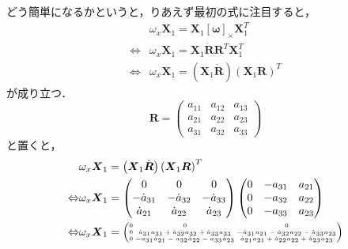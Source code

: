 どう簡単になるかというと，りあえず最初の式に注目すると，
\begin{align}
  & \omega_{x} \boldsymbol{X}_1 = \boldsymbol{X}_1 [\boldsymbol{\omega}]_{\times} \boldsymbol{X}_1^{T}\\
  \Leftrightarrow & \omega_{x} \boldsymbol{X}_1 = \boldsymbol{X}_1 \dot{\boldsymbol{R}} \boldsymbol{R}^{T} \boldsymbol{X}_1^{T}\\
  \Leftrightarrow & \omega_{x} \boldsymbol{X}_1 = \left(\boldsymbol{X}_1 \dot{\boldsymbol{R}}\right) \left(\boldsymbol{X}_1 \boldsymbol{R}\right)^{T}
\end{align}
が成り立つ．
\begin{equation}
  \boldsymbol{R} = \begin{pmatrix}
      a_{11} & a_{12} & a_{13}\\
      a_{21} & a_{22} & a_{23}\\
      a_{31} & a_{32} & a_{33}
  \end{pmatrix}
\end{equation}
と置くと，
\begin{align}
  & \omega_{x} \boldsymbol{X}_1 = \left(\boldsymbol{X}_1 \dot{\boldsymbol{R}}\right) \left(\boldsymbol{X}_1 \boldsymbol{R}\right)^{T}\\
  \Leftrightarrow & \omega_{x} \boldsymbol{X}_1 =
  \begin{pmatrix}
    0 & 0 & 0\\
    - \dot{a}_{31} & - \dot{a}_{32} & - \dot{a}_{33}\\
    \dot{a}_{21} & \dot{a}_{22} & \dot{a}_{23}
  \end{pmatrix}
  \begin{pmatrix}
    0 & - a_{31} & a_{21}\\
    0 & - a_{32} & a_{22}\\
    0 & - a_{33} & a_{23}
  \end{pmatrix}\\
  \Leftrightarrow & \omega_{x} \boldsymbol{X}_1 =
  {\tiny
    \setlength\arraycolsep{1pt}
    \begin{pmatrix}
      0 & 0 & 0\\
      0 & \dot{a}_{31} a_{31} + \dot{a}_{32} a_{32} + \dot{a}_{33} a_{33} & - \dot{a}_{31} a_{21} - \dot{a}_{32} a_{22} - \dot{a}_{33} a_{23}\\
      0 & - a_{31} \dot{a}_{21} - a_{32} \dot{a}_{22} - a_{33} \dot{a}_{23} & \dot{a}_{21} a_{21} + \dot{a}_{22} a_{22} + \dot{a}_{23} a_{23}
  \end{pmatrix}}
\end{align}
